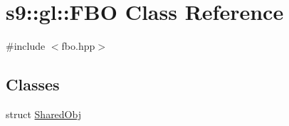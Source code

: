 \hypertarget{classs9_1_1gl_1_1FBO}{\section{s9\-:\-:gl\-:\-:F\-B\-O Class Reference}
\label{classs9_1_1gl_1_1FBO}
}


{\ttfamily \#include $<$fbo.\-hpp$>$}

\subsection*{Classes}
\begin{DoxyCompactItemize}
\item 
struct \hyperlink{structs9_1_1gl_1_1FBO_1_1SharedObj}{Shared\-Obj}
\end{DoxyCompactItemize}
